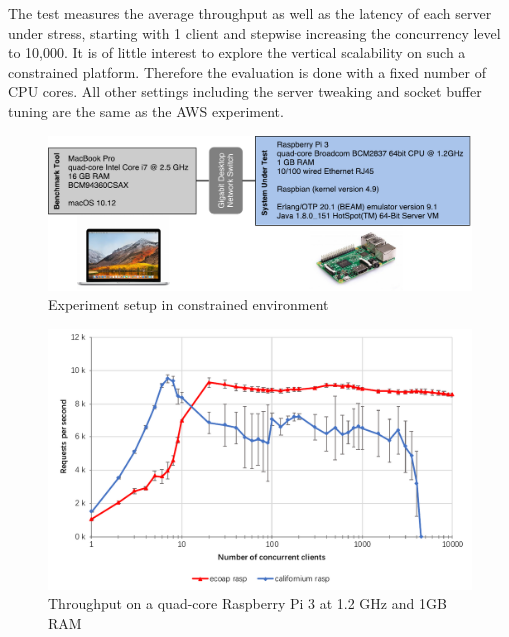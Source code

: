 The test measures the average throughput as well as the latency of each server under stress, starting with 1 client and stepwise increasing the concurrency level to 10,000. It is of little interest to explore the vertical scalability on such a constrained platform. Therefore the evaluation is done with a fixed number of CPU cores. All other settings including the server tweaking and socket buffer tuning are the same as the AWS experiment.

\begin{figure}[!htbp]
\centering
\includegraphics[scale = 0.6]{experiment_setting_rasp}
\caption{Experiment setup in constrained environment}
\label{fig:experiment_setting_rasp}
\end{figure}

\begin{figure}[!htbp]
\centering
\includegraphics[scale = 0.7]{throughput_rasp}
\caption{Throughput on a quad-core Raspberry Pi 3 at 1.2 GHz and 1GB RAM}
\label{fig:throughput_rasp}
\end{figure}

